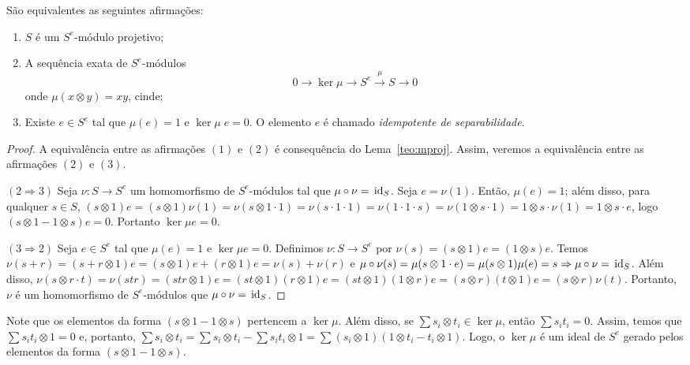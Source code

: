 \begin{teo} \label{teo:algsep}
São equivalentes as seguintes afirmações:
\begin{enumerate}
    \item $S$ é um $S^e$-módulo projetivo;
    \item A sequência exata de $S^e$-módulos $$0 \rightarrow \ker \mu \rightarrow S^e \xrightarrow{\mu} S \rightarrow 0$$onde $\mu(x\otimes y)=xy$, cinde;
    \item Existe $e \in S^e$ tal que $\mu(e)=1$ e $\ker \mu \;e=0$. O elemento $e$ é chamado \emph{idempotente de separabilidade}.
\end{enumerate}
\begin{proof}
A equivalência entre as afirmações $(1)$ e $(2)$ é consequência do Lema~\ref{teo:mproj}. Assim, veremos a equivalência entre as afirmações $(2)$ e $(3)$. \par 
$(2 \Rightarrow 3)$ Seja $\nu: S \rightarrow S^e$ um homomorfismo de $S^e$-módulos tal que $\mu \circ \nu = \, \textrm{id}_{S}$. Seja $e=\nu(1)$. Então, $\mu(e)=1$; além disso, para qualquer $s\in S$, $(s\otimes1)e = (s\otimes 1)\nu(1)=\nu(s\otimes1 \cdot 1) = \nu(s\cdot 1 \cdot 1) = \nu (1\cdot 1 \cdot s) = \nu(1\otimes s\cdot 1)=1\otimes s \cdot \nu (1) = 1\otimes s \cdot  e$, logo $(s\otimes 1 - 1\otimes s)e=0$. Portanto $\ker \mu e=0$.\par 
$(3\Rightarrow 2)$ Seja $e\in S^e$ tal que $\mu(e)=1$ e $\ker \mu e=0$. Definimos $\nu: S \rightarrow S^e$ por $\nu(s)=(s\otimes 1)e=(1\otimes s)e$. Temos $\nu(s+r)=(s+r\otimes 1)e=(s\otimes 1)e+(r\otimes 1)e=\nu(s)+\nu(r)$ e $\mu \circ\nu(s)=\mu(s\otimes 1 \cdot e) = \mu(s\otimes 1)\mu(e)=s\Rightarrow \mu\circ \nu = \, \textrm{id}_{S}$. Além disso, $\nu(s\otimes r \cdot t)=\nu(str) = (str\otimes 1)e = (st\otimes 1)(r\otimes 1)e =(st\otimes 1)(1\otimes r)e=(s\otimes r)(t\otimes 1)e= (s\otimes r)\nu(t)$. Portanto, $\nu$ é um homomorfismo de $S^e$-módulos que $\mu\circ \nu=\, \textrm{id}_{S}$.
\end{proof}
\end{teo}

Note que os elementos da forma $(s \otimes 1 - 1\otimes s)$ pertencem a $\ker \mu$. Além disso, se $\sum s_i \otimes t_i \in \ker \mu$, então $\sum s_i t_i = 0$. Assim, temos que $\sum s_i t_i \otimes 1 = 0$ e, portanto, $\sum s_i \otimes t_i = \sum s_i \otimes t_i - \sum s_i t_i \otimes 1 = \sum (s_i \otimes 1)(1 \otimes t_i - t_i \otimes 1)$. Logo, o $\ker \mu$ é um ideal de $S^e$ gerado pelos elementos da forma $(s \otimes 1 - 1 \otimes s)$.


